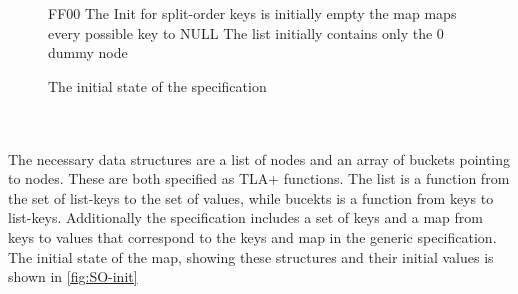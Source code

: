 \documentclass{uit-thesis}
\begin{document}
\begin{figure}
\begin{tla}
\end{tla}
\begin{tlatex}
%
\@pvspace{8.0pt}%
\@pvspace{8.0pt}%
\@pvspace{8.0pt}%
\@x{ {\ASSUME}}%
%
%
%
\@pvspace{8.0pt}%
\begin{lcom}{0}%
\begin{cpar}{0}{F}{F}{0}{0}{}%
The Init for split-order                          
 keys is initially empty                           
 the map maps every possible key to NULL           
 The list initially contains only the 0 dummy node 
\end{cpar}%
\end{lcom}%
%
%
%
%
%
\@pvspace{8.0pt}%
\end{tlatex}
\caption{The initial state of the specification}
\label{fig:SO-init}
\end{figure}
\\\\
The necessary data structures are a list of nodes and an array of buckets pointing to nodes. These are both specified as TLA+ functions. The list is a function from the set of list-keys to the set of values, while bucekts is a function from keys to list-keys. Additionally the specification includes a set of keys and a map from keys to values that correspond to the keys and map in the generic specification. The initial state of the map, showing these structures and their initial values is shown in \autoref{fig:SO-init}
\end{document}
